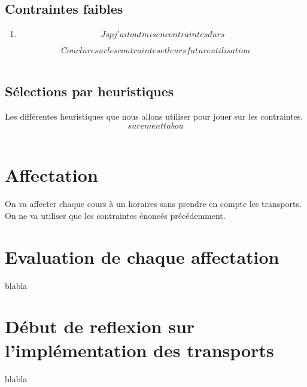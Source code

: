 \documentclass[a4paper,11pt]{article}
\begin{document}
	\subsection{Contraintes faibles}
		\begin{enumerate}
			\item $$Jsp j'ai tout mis en contraintes durs$$
		\end{enumerate}
	$$Conclure sur les contraintes et leurs future utilisation$$\\
	\subsection{Sélections par heuristiques}
		Les différentes heuristiques que nous allons utiliser pour jouer sur les 
		contraintes. $$surement tabou$$ \\
\section{Affectation}
	On va affecter chaque cours à un horaires sans prendre en compte les transports. On ne va utiliser que les contraintes énoncés précédemment. \\
	
\section{Evaluation de chaque affectation}
	blabla \\
	
\section{Début de reflexion sur l'implémentation des transports}
	blabla \\
\end{document}

